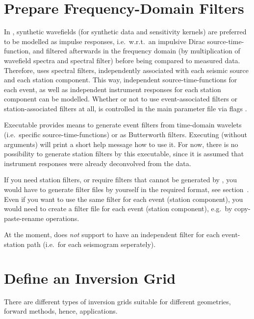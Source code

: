 \section{Prepare Frequency-Domain Filters} \label{basic_steps,sec:filters}
%
In \ASKI{}, synthetic wavefields (for synthetic data and sensitivity kernels) are preferred to 
be modelled as impulse responses, i.e.\ w.r.t.\ an impulsive Dirac source-time-function, and filtered afterwards
in the frequency domain (by multiplication of wavefield spectra and spectral filter) before being compared to 
measured data. Therefore, \ASKI{} uses spectral filters,
independently associated with each seismic source and each station component. This way, independent 
source-time-functions for each event, as well as independent instrument responses for each station component
can be modelled. Whether or not to use event-associated filters or station-associated filters at all, is 
controlled in the main parameter file via flags  
.

Executable   
provides means to generate event filters from time-domain wavelets
(i.e.\ specific source-time-functions) or as Butterworth filters. Executing 
(without arguments) will print a short help message how to use it.
For now, there is no possibility to 
generate station filters by this executable, since it is assumed that instrument responses were 
already deconvolved from the data. 

If you need station filters, or require filters that cannot be generated by , 
you would have to generate filter files by yourself in the required format, see section~.
Even if you want to use the same filter for each event (station component), you would need to create a filter file
for each event (station component), e.g.\ by copy-paste-rename operations.

At the moment, \ASKI{} does \emph{not} support to have an independent filter for each event-station path (i.e.\ for
each seismogram seperately). 
%
\section{Define an Inversion Grid} \label{basic_steps,sec:invgrid}
%
There are different types of \ASKI{} inversion grids suitable for different geometries, 
forward methods, hence, applications.

